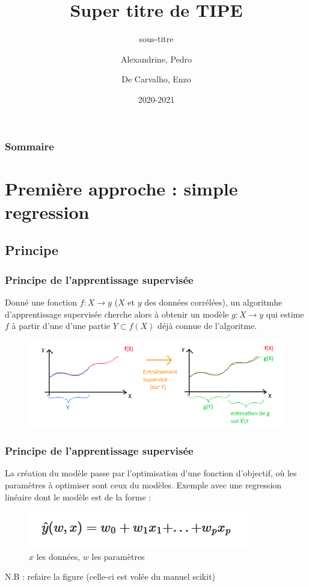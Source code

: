 \documentclass{beamer}
\title{Super titre de TIPE}
\subtitle{sous-titre}
\author{Alexandrine, Pedro\\\and De Carvalho, Enzo}
\date{2020-2021}
\begin{document}
\begin{frame}
	\maketitle
\end{frame}

\begin{frame}
	\frametitle{Sommaire}
	\tableofcontents
\end{frame}

\section{Première approche : simple regression}
\subsection{Principe}
\begin{frame}
	\frametitle{Principe de l'apprentissage supervisée}
	Donné une fonction $f : X \rightarrow y$ ($X$ et $y$ des données corrélées), un algoritmhe d'apprentissage supervisée cherche alors à obtenir un modèle $g : X \rightarrow y$ qui estime $f$ à partir d'une d'une partie $Y \subset f(X)$ déjà connue de l'algoritme.
	\begin{figure}[b]
		\centering
		\includegraphics[scale=0.65]{super_schema}
	\end{figure}
\end{frame}

\begin{frame}
	\frametitle{Principe de l'apprentissage supervisée}
	La création du modèle passe par l'optimisation d'une fonction d'objectif, où les paramètres à optimiser sont ceux du modèles.
	Exemple avec une regression linéaire dont le modèle est de la forme :
	\begin{figure}[h]
		\centering
		\includegraphics[scale=0.7]{f_lineair}
		\caption{$x$ les données, $w$ les paramètres}
	\end{figure}
	\alert{N.B : refaire la figure (celle-ci est volée du manuel scikit)}
\end{frame}
\end{document}
